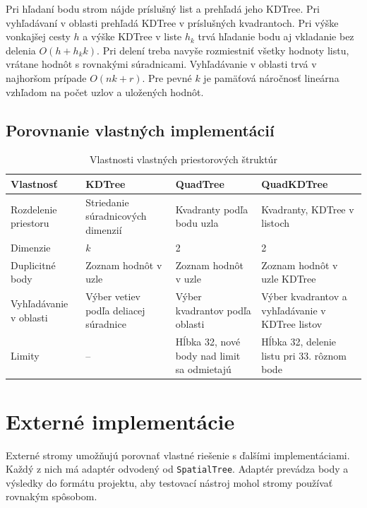 \documentclass[12pt,a4paper,oneside]{report}
\begin{document}
Pri hľadaní bodu strom nájde príslušný list a prehľadá jeho KDTree.
Pri vyhľadávaní v oblasti prehľadá KDTree v príslušných kvadrantoch.
Pri výške vonkajšej cesty \(h\) a výške KDTree v liste \(h_k\) trvá
hľadanie bodu aj vkladanie bez delenia \(O(h+h_k k)\). Pri delení treba
navyše rozmiestniť všetky hodnoty listu, vrátane hodnôt s rovnakými
súradnicami. Vyhľadávanie v oblasti trvá v najhoršom prípade \(O(nk+r)\).
Pre pevné \(k\) je pamäťová náročnosť lineárna vzhľadom na počet uzlov
a uložených hodnôt.

\section{Porovnanie vlastných implementácií}
\begin{table}[H]
\centering
\small
\begin{tabularx}{\textwidth}{@{}p{2.6cm}XXX@{}}
\toprule
\textbf{Vlastnosť} & \textbf{KDTree} & \textbf{QuadTree} & \textbf{QuadKDTree}\\
\midrule
Rozdelenie priestoru & Striedanie súradnicových dimenzií & Kvadranty podľa bodu uzla & Kvadranty, KDTree v listoch\\
Dimenzie & \(k\) & 2 & 2\\
Duplicitné body & Zoznam hodnôt v uzle & Zoznam hodnôt v uzle & Zoznam hodnôt v uzle KDTree\\
Vyhľadávanie v oblasti & Výber vetiev podľa deliacej súradnice & Výber kvadrantov podľa oblasti & Výber kvadrantov a vyhľadávanie v KDTree listov\\
Limity & -- & Hĺbka 32, nové body nad limit sa odmietajú & Hĺbka 32, delenie listu pri 33. rôznom bode\\
\bottomrule
\end{tabularx}
\caption{Vlastnosti vlastných priestorových štruktúr}
\label{tab:own-trees}
\end{table}

\chapter{Externé implementácie}
\label{chap:external}

Externé stromy umožňujú porovnať vlastné riešenie s ďalšími
implementáciami. Každý z nich má adaptér odvodený od \texttt{SpatialTree}.
Adaptér prevádza body a výsledky do formátu projektu, aby testovací
nástroj mohol stromy používať rovnakým spôsobom.
\end{document}
